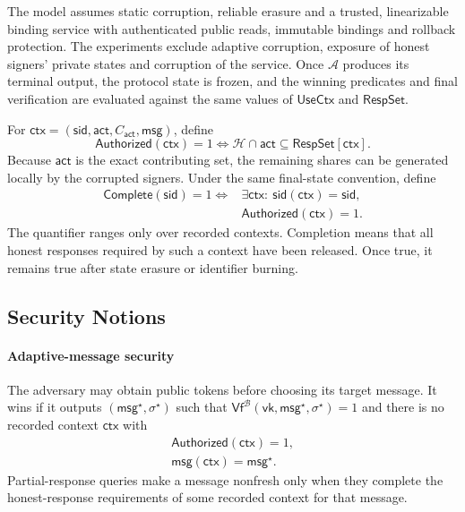 \documentclass[lettersize,journal]{IEEEtran}
\begin{document}
The model assumes static corruption, reliable erasure and a trusted,
linearizable binding service with authenticated public reads, immutable
bindings and rollback protection. The experiments exclude adaptive
corruption, exposure of honest signers' private states and corruption of
the service. Once $\mathcal A$ produces its terminal output, the protocol
state is frozen, and the winning predicates and final verification are
evaluated against the same values of $\mathsf{UseCtx}$ and
$\mathsf{RespSet}$.

For $\mathsf{ctx}=(\mathsf{sid},\mathsf{act},C_{\mathsf{act}},\mathsf{msg})$,
define
\[
\mathsf{Authorized}(\mathsf{ctx})=1
\iff\mathcal H\cap\mathsf{act}\subseteq\mathsf{RespSet}[\mathsf{ctx}].
\]
Because $\mathsf{act}$ is the exact contributing set, the remaining
shares can be generated locally by the corrupted signers. Under the same
final-state convention, define
\[
\begin{aligned}
\mathsf{Complete}(\mathsf{sid})=1
\iff{}&\exists\mathsf{ctx}:\ \mathsf{sid}(\mathsf{ctx})=\mathsf{sid},\\
&\mathsf{Authorized}(\mathsf{ctx})=1.
\end{aligned}
\]
The quantifier ranges only over recorded contexts. Completion means that
all honest responses required by such a context have been released.
Once true, it remains true after state erasure or identifier burning.

\subsection{Security Notions}
\paragraph{Adaptive-message security}
The adversary may obtain public tokens before choosing its target message.
It wins if it outputs $(\mathsf{msg}^{\star},\sigma^{\star})$ such that
$\mathsf{Vf}^{\mathcal B}(\mathsf{vk},\mathsf{msg}^{\star},
\sigma^{\star})=1$ and there is no recorded context $\mathsf{ctx}$ with
\[
\begin{gathered}
\mathsf{Authorized}(\mathsf{ctx})=1,\\
\mathsf{msg}(\mathsf{ctx})=\mathsf{msg}^{\star}.
\end{gathered}
\]
Partial-response queries make a message nonfresh only when they complete
the honest-response requirements of some recorded context for that message.
\end{document}
